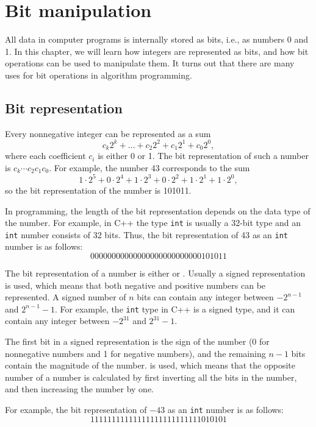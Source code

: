 \chapter{Bit manipulation}

All data in computer programs is internally stored as bits,
i.e., as numbers 0 and 1.
In this chapter, we will learn how integers
are represented as bits, and how bit operations
can be used to manipulate them.
It turns out that there are many uses for
bit operations in algorithm programming.

\section{Bit representation}


Every nonnegative integer can be represented as a sum
\[c_k 2^k + \ldots + c_2 2^2 + c_1 2^1 + c_0 2^0,\]
where each coefficient $c_i$ is either 0 or 1.
The bit representation of such a number is
$c_k \cdots c_2 c_1 c_0$.
For example, the number 43 corresponds to the sum
\[1 \cdot 2^5 + 0 \cdot 2^4 + 1 \cdot 2^3 + 0 \cdot 2^2 + 1 \cdot 2^1 + 1 \cdot 2^0,\]
so the bit representation of the number is 101011.

In programming, the length of the bit representation
depends on the data type of the number.
For example, in C++ the type \texttt{int} is
usually a 32-bit type and an \texttt{int} number
consists of 32 bits.
Thus, the bit representation of 43
as an \texttt{int} number is as follows:
\[00000000000000000000000000101011\]

The bit representation of a number is either
 or .
Usually a signed representation is used,
which means that both negative and positive
numbers can be represented.
A signed number of $n$ bits can contain any
integer between $-2^{n-1}$ and $2^{n-1}-1$.
For example, the \texttt{int} type in C++ is
a signed type, and it can contain any
integer between $-2^{31}$ and $2^{31}-1$.

The first bit in a signed representation
is the sign of the number (0 for nonnegative numbers
and 1 for negative numbers), and
the remaining $n-1$ bits contain the magnitude of the number.
 is used, which means that the
opposite number of a number is calculated by first
inverting all the bits in the number,
and then increasing the number by one.

For example, the bit representation of $-43$
as an \texttt{int} number is as follows:
\[11111111111111111111111111010101\]

